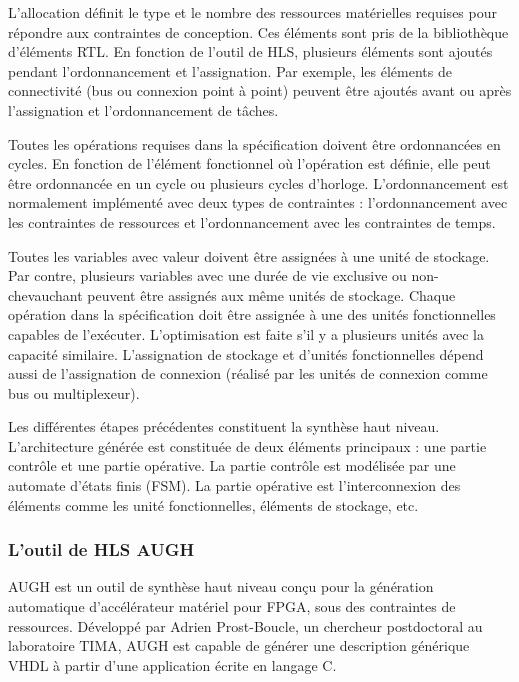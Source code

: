 L'allocation définit le type et le nombre des ressources matérielles requises pour répondre aux contraintes de conception.
Ces éléments sont pris de la bibliothèque d'éléments RTL.
En fonction de l'outil de HLS, plusieurs éléments sont ajoutés pendant l'ordonnancement et l'assignation.
Par exemple, les éléments de connectivité (bus ou connexion point à point) peuvent être ajoutés avant ou
après l'assignation et l'ordonnancement de tâches.

Toutes les opérations requises dans la spécification doivent être ordonnancées en cycles.
En fonction de l'élément fonctionnel où l'opération est définie, elle peut être ordonnancée
en un cycle ou plusieurs cycles d'horloge. L'ordonnancement est normalement implémenté avec deux types de contraintes :
l'ordonnancement avec les contraintes de ressources et l'ordonnancement avec les contraintes de temps.

Toutes les variables avec valeur doivent être assignées à une unité de stockage. Par contre, plusieurs variables
avec une durée de vie exclusive ou non-chevauchant peuvent être assignés aux même unités de stockage.
Chaque opération dans la spécification doit être assignée à une des unités fonctionnelles capables de l'exécuter.
L'optimisation est faite s'il y a plusieurs unités avec la capacité similaire.
L'assignation de stockage et d'unités fonctionnelles dépend aussi de l'assignation de connexion (réalisé
par les unités de connexion comme bus ou multiplexeur).

Les différentes étapes précédentes constituent la synthèse haut niveau. L'architecture générée est constituée de deux éléments principaux : une partie contrôle
et une partie opérative. La partie contrôle est modélisée par une automate d'états finis (FSM). La partie opérative est
l'interconnexion des éléments comme les unité fonctionnelles, éléments de stockage, etc.

\subsubsection*{L'outil de HLS AUGH}

AUGH est un outil de synthèse haut niveau conçu pour la génération automatique d'accélérateur matériel
pour FPGA, sous des contraintes de ressources\cite{Prost2014}. Développé par 
Adrien Prost-Boucle, un chercheur postdoctoral au laboratoire TIMA, 
AUGH est capable de générer une description générique VHDL à partir
d'une application écrite en langage C. 

